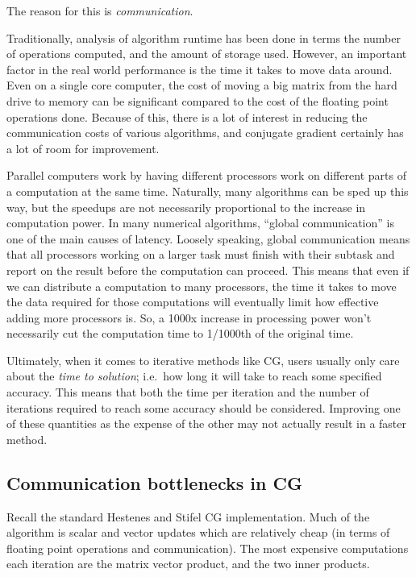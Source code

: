 \documentclass[10pt]{article}
\begin{document}
The reason for this is \emph{communication}.

Traditionally, analysis of algorithm runtime has been done in terms the number of operations computed, and the amount of storage used.
However, an important factor in the real world performance is the time it takes to move data around.
Even on a single core computer, the cost of moving a big matrix from the hard drive to memory can be significant compared to the cost of the floating point operations done.
Because of this, there is a lot of interest in reducing the communication costs of various algorithms, and conjugate gradient certainly has a lot of room for improvement.

Parallel computers work by having different processors work on different parts of a computation at the same time.
Naturally, many algorithms can be sped up this way, but the speedups are not necessarily proportional to the increase in computation power.
In many numerical algorithms, ``global communication'' is one of the main causes of latency.
Loosely speaking, global communication means that all processors working on a larger task must finish with their subtask and report on the result before the computation can proceed.
This means that even if we can distribute a computation to many processors, the time it takes to move the data required for those computations will eventually limit how effective adding more processors is.
So, a 1000x increase in processing power won't necessarily cut the computation time to 1/1000th of the original time.

Ultimately, when it comes to iterative methods like CG, users usually only care about the \emph{time to solution}; i.e.~how long it will take to reach some specified accuracy.
This means that both the time per iteration and the number of iterations required to reach some accuracy should be considered.
Improving one of these quantities as the expense of the other may not actually result in a faster method.

\subsection{Communication bottlenecks in CG}

Recall the standard Hestenes and Stifel CG implementation.
Much of the algorithm is scalar and vector updates which are relatively cheap (in terms of floating point operations and communication).
The most expensive computations each iteration are the matrix vector product, and the two inner products.
\end{document}
